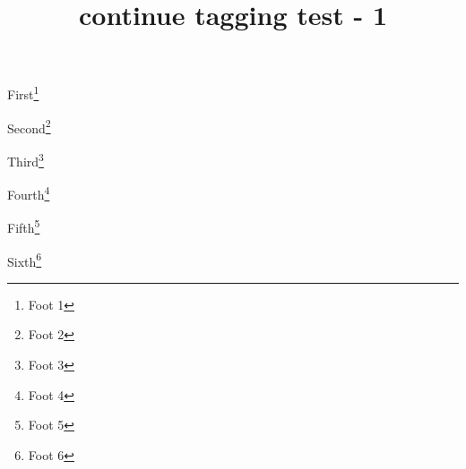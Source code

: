 \documentclass[a5paper,twoside]{article}
\title{continue tagging test - 1}
\begin{document}
First\footnote{Foot 1} \kant[1]

Second\footnote{Foot 2} \kant[2]

Third\footnote{Foot 3} \kant[3]

\contstop %

Fourth\footnote{Foot 4} \kant[4]

Fifth\footnote{Foot 5} \kant[5]

\contgo %

Sixth\footnote{Foot 6} \kant[6]
\end{document}
